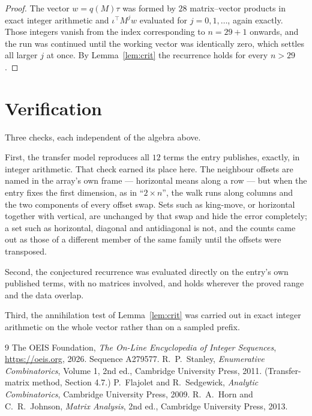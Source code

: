 \documentclass[11pt,a4paper]{article}
\theoremstyle{plain}
\theoremstyle{definition}
\begin{document}
\begin{proof}
The vector $w=q(M)\tau$ was formed by $28$ matrix--vector products in exact integer
arithmetic and $\iota^{\!\top}M^{j}w$ evaluated for $j=0,1,\dots$, again exactly. Those
integers vanish from the index corresponding to $n=29+1$ onwards, and the run was
continued until the working vector was identically zero, which settles all larger $j$ at once.
By Lemma~\ref{lem:crit} the recurrence holds for every $n>29$.
\end{proof}

\section{Verification}

Three checks, each independent of the algebra above.

First, the transfer model reproduces all $12$ terms the entry publishes, exactly, in
integer arithmetic. That check earned its place here. The neighbour offsets are named in the
array's own frame --- horizontal means along a row --- but when the entry fixes the first
dimension, as in ``$2\times n$'', the walk runs along columns and the two components of every
offset swap. Sets such as king-move, or horizontal together with vertical, are unchanged by
that swap and hide the error completely; a set such as horizontal, diagonal and antidiagonal
is not, and the counts came out as those of a different member of the same family until the
offsets were transposed.

Second, the conjectured recurrence was evaluated directly on the entry's own published terms,
with no matrices involved, and holds wherever the proved range and the data overlap.

Third, the annihilation test of Lemma~\ref{lem:crit} was carried out in exact integer
arithmetic on the whole vector rather than on a sampled prefix.

\begin{thebibliography}{9}
 The OEIS Foundation, \emph{The On-Line Encyclopedia of Integer
Sequences}, \url{https://oeis.org}, 2026. Sequence A279577.
 R.~P.~Stanley, \emph{Enumerative Combinatorics}, Volume 1, 2nd ed.,
Cambridge University Press, 2011. (Transfer-matrix method, Section 4.7.)
 P.~Flajolet and R.~Sedgewick, \emph{Analytic Combinatorics}, Cambridge
University Press, 2009.
 R.~A.~Horn and C.~R.~Johnson, \emph{Matrix Analysis}, 2nd ed., Cambridge
University Press, 2013.
\end{thebibliography}
\end{document}
